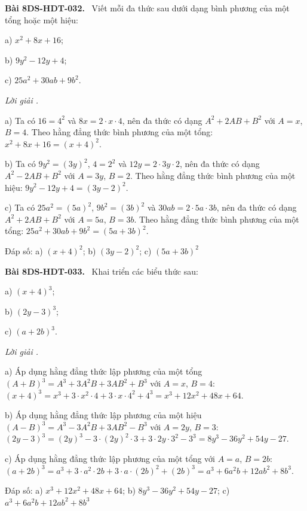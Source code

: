\documentclass[12pt,a4paper]{article}
\newenvironment{problem}[1][]{\par\medskip\noindent\textbf{Bài #1.}\ }{\par}
\newenvironment{solution}[1][]{\par\noindent\textit{Lời giải #1.}\par}{\par}
\begin{document}
\begin{problem}[8DS-HDT-032]
Viết mỗi đa thức sau dưới dạng bình phương của một tổng hoặc một hiệu:

a) $x^2 + 8x + 16$;

b) $9y^2 - 12y + 4$;

c) $25a^2 + 30ab + 9b^2$.

\begin{solution}
a) Ta có $16 = 4^2$ và $8x = 2 \cdot x \cdot 4$, nên đa thức có dạng $A^2 + 2AB + B^2$ với $A = x$, $B = 4$. Theo hằng đẳng thức bình phương của một tổng: $x^2 + 8x + 16 = (x + 4)^2$.

b) Ta có $9y^2 = (3y)^2$, $4 = 2^2$ và $12y = 2 \cdot 3y \cdot 2$, nên đa thức có dạng $A^2 - 2AB + B^2$ với $A = 3y$, $B = 2$. Theo hằng đẳng thức bình phương của một hiệu: $9y^2 - 12y + 4 = (3y - 2)^2$.

c) Ta có $25a^2 = (5a)^2$, $9b^2 = (3b)^2$ và $30ab = 2 \cdot 5a \cdot 3b$, nên đa thức có dạng $A^2 + 2AB + B^2$ với $A = 5a$, $B = 3b$. Theo hằng đẳng thức bình phương của một tổng: $25a^2 + 30ab + 9b^2 = (5a + 3b)^2$.

Đáp số: a) $\boxed{(x + 4)^2}$; b) $\boxed{(3y - 2)^2}$; c) $\boxed{(5a + 3b)^2}$
\end{solution}
\end{problem}

\begin{problem}[8DS-HDT-033]
Khai triển các biểu thức sau:

a) $(x + 4)^3$;

b) $(2y - 3)^3$;

c) $(a + 2b)^3$.

\begin{solution}
a) Áp dụng hằng đẳng thức lập phương của một tổng $(A + B)^3 = A^3 + 3A^2B + 3AB^2 + B^3$ với $A = x$, $B = 4$: $(x + 4)^3 = x^3 + 3 \cdot x^2 \cdot 4 + 3 \cdot x \cdot 4^2 + 4^3 = x^3 + 12x^2 + 48x + 64$.

b) Áp dụng hằng đẳng thức lập phương của một hiệu $(A - B)^3 = A^3 - 3A^2B + 3AB^2 - B^3$ với $A = 2y$, $B = 3$: $(2y - 3)^3 = (2y)^3 - 3 \cdot (2y)^2 \cdot 3 + 3 \cdot 2y \cdot 3^2 - 3^3 = 8y^3 - 36y^2 + 54y - 27$.

c) Áp dụng hằng đẳng thức lập phương của một tổng với $A = a$, $B = 2b$: $(a + 2b)^3 = a^3 + 3 \cdot a^2 \cdot 2b + 3 \cdot a \cdot (2b)^2 + (2b)^3 = a^3 + 6a^2b + 12ab^2 + 8b^3$.

Đáp số: a) $\boxed{x^3 + 12x^2 + 48x + 64}$; b) $\boxed{8y^3 - 36y^2 + 54y - 27}$; c) $\boxed{a^3 + 6a^2b + 12ab^2 + 8b^3}$
\end{solution}
\end{problem}
\end{document}
